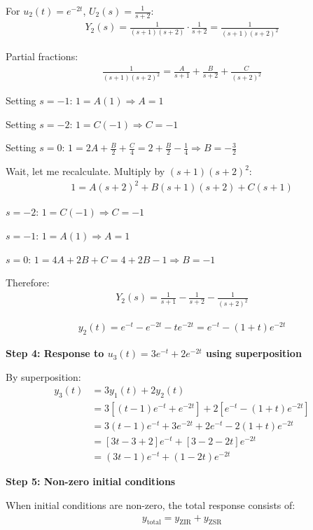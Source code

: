 \documentclass[11pt,a4paper]{article}
\begin{document}
For $u_2(t) = e^{-2t}$, $U_2(s) = \frac{1}{s+2}$:
\begin{align}
  Y_2(s) = \frac{1}{(s+1)(s+2)} \cdot \frac{1}{s+2} = \frac{1}{(s+1)(s+2)^2}
\end{align}

Partial fractions:
\begin{align}
  \frac{1}{(s+1)(s+2)^2} = \frac{A}{s+1} + \frac{B}{s+2} + \frac{C}{(s+2)^2}
\end{align}

Setting $s = -1$: $1 = A(1) \Rightarrow A = 1$

Setting $s = -2$: $1 = C(-1) \Rightarrow C = -1$

Setting $s = 0$: $1 = 2A + \frac{B}{2} + \frac{C}{4} = 2 + \frac{B}{2} - \frac{1}{4} \Rightarrow B = -\frac{3}{2}$

Wait, let me recalculate. Multiply by $(s+1)(s+2)^2$:
\begin{align}
  1 = A(s+2)^2 + B(s+1)(s+2) + C(s+1)
\end{align}

$s = -2$: $1 = C(-1) \Rightarrow C = -1$

$s = -1$: $1 = A(1) \Rightarrow A = 1$

$s = 0$: $1 = 4A + 2B + C = 4 + 2B - 1 \Rightarrow B = -1$

Therefore:
\begin{align}
  Y_2(s) = \frac{1}{s+1} - \frac{1}{s+2} - \frac{1}{(s+2)^2}
\end{align}

\begin{align}
  y_2(t) = e^{-t} - e^{-2t} - te^{-2t} = e^{-t} - (1+t)e^{-2t}
\end{align}

\textbf{Step 4: Response to $u_3(t) = 3e^{-t} + 2e^{-2t}$ using superposition}

By superposition:
\begin{align}
  y_3(t) &= 3y_1(t) + 2y_2(t) \\
  &= 3[(t-1)e^{-t} + e^{-2t}] + 2[e^{-t} - (1+t)e^{-2t}] \\
  &= 3(t-1)e^{-t} + 3e^{-2t} + 2e^{-t} - 2(1+t)e^{-2t} \\
  &= [3t - 3 + 2]e^{-t} + [3 - 2 - 2t]e^{-2t} \\
  &= (3t - 1)e^{-t} + (1 - 2t)e^{-2t}
\end{align}

\textbf{Step 5: Non-zero initial conditions}

When initial conditions are non-zero, the total response consists of:
\begin{align}
  y_{\text{total}} = y_{\text{ZIR}} + y_{\text{ZSR}}
\end{align}
\end{document}
